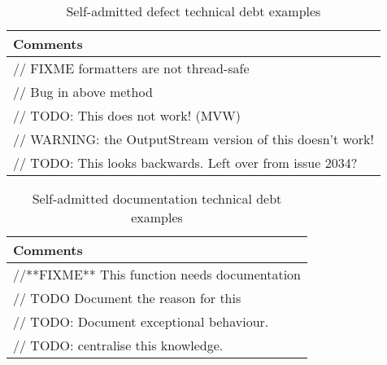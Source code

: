 \begin{table}[!hbt]
      \begin{center}
            \caption{Self-admitted defect technical debt examples}
            \label{tab:defect_debt_detail}
            \begin{tabular}{l}
            \toprule
            \textbf{Comments}     \\ \midrule 
             // FIXME formatters are not thread-safe\\                                   
             // Bug in above method \\                                   
             // TODO: This does not work! (MVW)\\                                   
             // WARNING: the OutputStream version of this doesn't work!\\                                   
             // TODO: This looks backwards. Left over from issue 2034? \\ \bottomrule
            \end{tabular}
      \end{center}
\end{table}

\begin{table}[!hbt]
      \begin{center}
            \caption{Self-admitted documentation technical debt examples}
            \label{tab:documentation_debt_detail}
            \begin{tabular}{l}
            \toprule
            \textbf{Comments}     \\ \midrule 
            //**FIXME** This function needs documentation\\                                   
            // TODO Document the reason for this\\                                   
            // TODO: Document exceptional behaviour.\\                                   
            // TODO: centralise this knowledge.\\  \bottomrule
            \end{tabular}
      \end{center}
\end{table}


